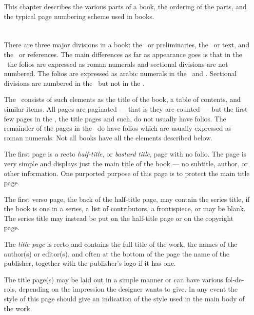 \documentclass[10pt,letterpaper,extrafontsizes]{memoir}
\begin{document}
    This chapter describes the various parts of a book, the 
ordering of the parts, and the typical page numbering scheme used
in books. 

\section{\prFrontmatter}


    There are three major divisions in a book: 
the \pixfrontmatter\ or preliminaries, 
the \pixmainmatter\ or text, 
and the \pixbackmatter\ or references. 
The main differences as
far as appearance goes is that in the \pixfrontmatter\ the folios are 
expressed as roman numerals and sectional divisions are not numbered. The 
folios are expressed as arabic numerals in the \pixmainmatter\ 
and \pixbackmatter. Sectional
divisions are numbered in the \pixmainmatter\ but not in the \pixbackmatter.

    The \pixfrontmatter\ consists of such elements as the title
of the book, a table of contents\ixtoc, and similar items. All pages are
paginated\index{pagination} --- that is they are counted --- but the first 
few pages in the \pixfrontmatter, the title pages and such, do not usually have 
folios\index{folio}. 
The remainder of the pages in the \pixfrontmatter\ do have folios 
which are usually expressed as roman numerals. Not all
books have all the elements described below.

    The first page is a recto 
\emph{half-title},
or \emph{bastard title}\index{bastard title page},
page with no folio\index{folio}. 
The page is very simple and displays just the main title of the book --- 
no subtitle, author, or other information. One purported purpose of this
page is to protect the main title page.

    The first verso page, the back of the half-title page, may contain the 
series title, if the book is one in a series, a list of contributors, 
a frontispiece, or may be blank. The series title may instead be put on the 
half-title page or on the copyright page.

   The \emph{title page} is recto and contains the full 
title of the work, the names of the author(s) or editor(s), and often at the
bottom of the page the name of the publisher, together with the publisher's 
logo if it has one.

    The title page(s) may be laid out in a simple manner or can have various
fol-de-rols, depending on the impression the designer wants to give. In
any event the style of this page should give an indication of the style
used in the main body of the work.
\end{document}

